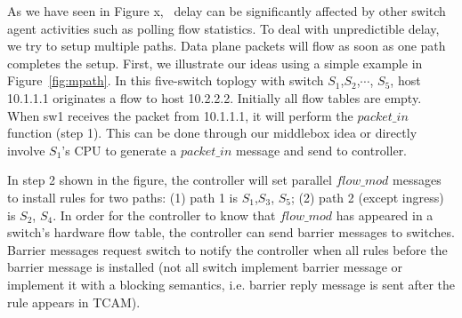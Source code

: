 As we have seen in Figure x, \flowmod\ delay can be significantly affected by
other switch agent activities such as polling flow statistics.
%
To deal with unpredictible delay, we try to setup multiple paths. Data plane packets will
flow as soon as one path completes the setup. 
First, we illustrate our ideas using a simple example in
Figure~\ref{fig:mpath}. In this five-switch toplogy with switch
$S_1$,$S_2$,$\cdots$, $S_5$, host 10.1.1.1 originates a flow to host
10.2.2.2. Initially all flow tables are empty.
When sw1 receives the packet from 10.1.1.1, it will perform
the $packet\_in$ function (step 1). This can be done through our middlebox idea or
directly involve $S_1$'s CPU to generate a $packet\_in$ message and send to
controller. 

In step 2 shown in the figure, the controller will set parallel
$flow\_mod$ messages to install rules for two paths: (1) path 1 is $S_1$,$S_3$,
$S_5$; (2) path 2 (except ingress) is $S_2$, $S_4$. In order for the controller to know
that $flow\_mod$ has appeared in a switch's hardware flow table, the controller
can send barrier messages to switches. Barrier messages request switch to notify
the controller when all rules before the barrier message is installed (not all
switch implement barrier message or implement it with a 
blocking semantics, i.e. barrier reply message is sent after the rule appears in
TCAM).  %

